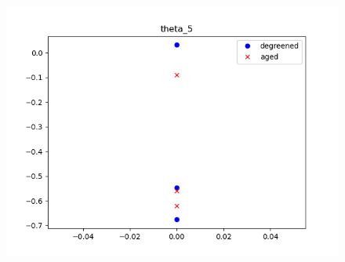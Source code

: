 \begin{figure}[H]
\begin{minipage}{0.3\textwidth}
                \includegraphics[width = \textwidth]{./figs/figs_new_mdl/theta_5.png}
        \end{minipage}
\end{figure}


